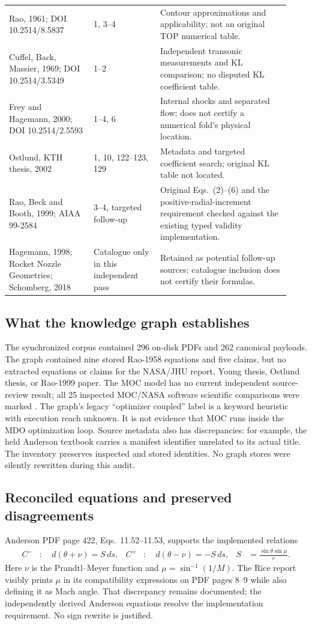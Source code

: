 \begin{longtable}{@{}P{0.28\linewidth}P{0.22\linewidth}P{0.43\linewidth}@{}}
Rao, 1961; DOI 10.2514/8.5837 & 1, 3--4 & Contour approximations and applicability; not an original TOP numerical table.\\
Cuffel, Back, Massier, 1969; DOI 10.2514/3.5349 & 1--2 & Independent transonic measurements and KL comparison; no disputed KL coefficient table.\\
Frey and Hagemann, 2000; DOI 10.2514/2.5593 & 1--4, 6 & Internal shocks and separated flow; does not certify a numerical fold's physical location.\\
Ostlund, KTH thesis, 2002 & 1, 10, 122--123, 129 & Metadata and targeted coefficient search; original KL table not located.\\
Rao, Beck and Booth, 1999; AIAA 99-2584 & 3--4, targeted follow-up & Original Eqs.~(2)--(6) and the positive-radial-increment requirement checked against the existing typed validity implementation.\\
Hagemann, 1998; Rocket Nozzle Geometries; Schomberg, 2018 & Catalogue only in this independent pass & Retained as potential follow-up sources; catalogue inclusion does not certify their formulas.\\
\bottomrule
\end{longtable}

\subsection{What the knowledge graph establishes}
The synchronized corpus contained 296 on-disk PDFs and 262 canonical payloads.
The graph contained nine stored Rao-1958 equations and five claims, but no extracted
equations or claims for the NASA/JHU report, Young thesis, Ostlund thesis, or
Rao-1999 paper. The MOC model has no current independent source-review result;
all 25 inspected MOC/NASA software scientific comparisons were marked
. The graph's legacy ``optimizer coupled'' label is a
keyword heuristic with execution reach unknown. It is not evidence that MOC
runs inside the MDO optimization loop. Source metadata also has discrepancies:
for example, the held Anderson textbook carries a manifest identifier unrelated
to its actual title. The inventory preserves inspected and stored identities.
No graph stores were silently rewritten during this audit.

\subsection{Reconciled equations and preserved disagreements}
Anderson PDF page 422, Eqs.~11.52--11.53, supports the implemented relations
\begin{align}
C^- &: \quad d(\theta+\nu)=S\,ds, &
C^+ &: \quad d(\theta-\nu)=-S\,ds, &
S &= \frac{\sin\theta\sin\mu}{r}.
\end{align}
Here $\nu$ is the Prandtl--Meyer function and $\mu=\sin^{-1}(1/M)$.
The Rice report visibly prints $\mu$ in its compatibility expressions on
PDF pages 8--9 while also defining it as Mach angle. That discrepancy remains
documented; the independently derived Anderson equations resolve the
implementation requirement. No sign rewrite is justified.

